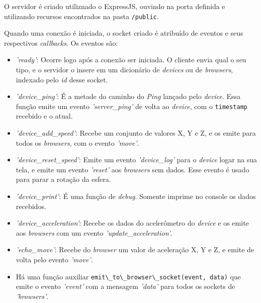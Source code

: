 \documentclass[a4paper,12pt]{article}
\newcommand{\code}[1]{\lstinline[mathescape=true, columns=fixed, basicstyle={\small\ttfamily}]{#1}}
\begin{document}
O servidor é criado utiliznado o ExpressJS, ouvindo na porta definida e utilizando recursos encontrados na pasta \code{/public}.

Quando uma conexão é iniciada, o socket criado é atribuído de eventos e seus respectivos \emph{callbacks}. Os eventos são:

\begin{itemize}

    \item \emph{'ready'}: Ocorre logo após a conexão ser iniciada. O cliente envia qual o seu tipo, e o servidor o insere em um dicionário de \emph{devices} ou de \emph{browsers}, indexado pelo \emph{id} desse socket.

    \item \emph{'device\_ping'}: É a metade do caminho do \emph{Ping} lançado pelo \emph{device}. Essa função emite um evento \emph{'server\_ping'} de volta ao \emph{device}, com o \code{timestamp} recebido e o atual.

    \item \emph{'device\_add\_speed'}: Recebe um conjunto de valores X, Y e Z, e os emite para todos os \emph{browsers}, com o evento \emph{'move'}.

    \item \emph{'device\_reset\_speed'}: Emite um evento \emph{'device\_log'} para o \emph{device} logar na sua tela, e emite um evento \emph{'reset'} aos \emph{browsers} sem dados. Esse evento é usado para parar a rotação da esfera.

    \item \emph{'device\_print'}: É uma função de \emph{debug}. Somente imprime no console os dados recebidos.

    \item \emph{'device\_acceleration'}: Recebe os dados do acelerômetro do \emph{device} e os emite aos \emph{browsers} com um evento \emph{'update\_acceleration'}.

    \item \emph{'echo\_move'}: Recebe do \emph{browser} um valor de aceleração X, Y e Z, e emite de volta pelo evento \emph{'move'}.

    \item Há uma função auxiliar \code{emit\_to\_browser\_socket(event, data)} que emite o evento \emph{'event'} com a mensagem \emph{'data'} para todos os sockets de \emph{'browsers'}.

\end{itemize}
\end{document}
